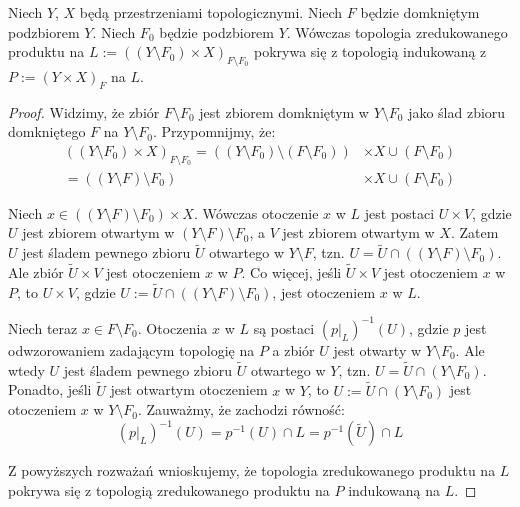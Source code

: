 \begin{lem} \label{lem:reduced-product-subspace}
  Niech $Y$, $X$ będą przestrzeniami topologicznymi. Niech $F$ będzie domkniętym podzbiorem $Y$. Niech $F_0$ będzie podzbiorem $Y$. Wówczas topologia zredukowanego produktu na $L := ((Y\setminus F_0)\times X)_{F\setminus F_0}$ pokrywa się z topologią indukowaną z $P := (Y\times X)_F$ na $L$.
  
  \begin{proof}
    Widzimy, że zbiór $F\setminus F_0$ jest zbiorem domkniętym w $Y\setminus F_0$ jako ślad zbioru domkniętego $F$ na $Y\setminus F_0$.
    Przypomnijmy, że:
    \begin{align*}
    ((Y\setminus F_0)\times X)_{F\setminus F_0} = ((Y\setminus F_0) \setminus (F\setminus F_0)) &\times X \cup (F\setminus F_0) \\
    = ((Y\setminus F)\setminus F_0) &\times X \cup (F\setminus F_0)
    \end{align*}

    Niech $x \in ((Y\setminus F) \setminus F_0)\times X$. Wówczas otoczenie $x$ w $L$ jest postaci $U\times V$, gdzie $U$ jest zbiorem otwartym w $(Y\setminus F)\setminus F_0$, a $V$ jest zbiorem otwartym w $X$. Zatem $U$ jest śladem pewnego zbioru $\tilde{U}$ otwartego w $Y\setminus F$, tzn. $U = \tilde{U} \cap ((Y\setminus F)\setminus F_0)$. Ale zbiór $\tilde{U}\times V$ jest otoczeniem $x$ w $P$. Co więcej, jeśli $\tilde{U}\times V$ jest otoczeniem $x$ w $P$, to $U\times V$, gdzie $U := \tilde{U}\cap((Y\setminus F)\setminus F_0)$, jest otoczeniem $x$ w $L$.
    
    Niech teraz $x\in F\setminus F_0$. Otoczenia $x$ w $L$ są postaci $(p|_{L})^{-1}(U)$, gdzie $p$ jest odwzorowaniem zadającym topologię na $P$ a zbiór $U$ jest otwarty w $Y\setminus F_0$. Ale wtedy $U$ jest śladem pewnego zbioru $\tilde{U}$ otwartego w $Y$, tzn. $U = \tilde{U}\cap(Y\setminus F_0)$. Ponadto, jeśli $\tilde{U}$ jest otwartym otoczeniem $x$ w $Y$, to $U := \tilde{U}\cap(Y\setminus F_0)$ jest otoczeniem $x$ w $Y\setminus F_0$. Zauważmy, że zachodzi równość:
    \[
      (p|_L)^{-1}(U) = p^{-1}(U) \cap L = p^{-1}(\tilde{U}) \cap L
    \]
    
    Z powyższych rozważań wnioskujemy, że topologia zredukowanego produktu na $L$ pokrywa się z topologią zredukowanego produktu na $P$ indukowaną na $L$.
  \end{proof}
\end{lem}

